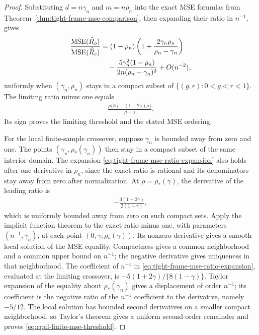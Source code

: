 \documentclass{article}
\theoremstyle{plain} %
\theoremstyle{definition} %
\theoremstyle{definition} %
\newcommand{\hR}{\hat{R}}
\begin{document}
\begin{proof}

Substituting $d=n\gamma_n$ and $m=n\rho_n$ into the exact MSE formulas
from Theorem~\ref{thm:tight-frame-mse-comparison}, then expanding their
ratio in $n^{-1}$, gives
\begin{align}
    \frac{\operatorname{MSE}(\hR_o)}
         {\operatorname{MSE}(\widehat R_c)}
    &=(1-\rho_n)\left(1+
       \frac{2\gamma_n\rho_n}{\rho_n-\gamma_n}\right) \notag\\
    &\quad-\frac{5\gamma_n^2(1-\rho_n)}
       {2n(\rho_n-\gamma_n)^2}+O(n^{-2}),
    \label{eq:tight-frame-mse-ratio-expansion}
\end{align}
uniformly when $(\gamma_n,\rho_n)$ stays in a compact subset of
$\{(g,r):0<g<r<1\}$. The limiting ratio minus one equals
\begin{align*}
    \frac{\rho\{3\gamma-(1+2\gamma)\rho\}}{\rho-\gamma}.
\end{align*}
     Its sign proves the limiting threshold and the stated MSE ordering. 

For the local finite-sample crossover, suppose $\gamma_n$ is bounded away
from zero and one. The points
$(\gamma_n,\rho_*(\gamma_n))$ then stay in a compact subset of the same
interior domain. The expansion
\eqref{eq:tight-frame-mse-ratio-expansion} also holds after one derivative
in $\rho_n$, since the exact ratio is rational and its denominators stay
away from zero after normalization. At $\rho=\rho_*(\gamma)$, the
derivative of the leading ratio is
\begin{align*}
    -\frac{3(1+2\gamma)}{2(1-\gamma)},
\end{align*}
which is uniformly bounded away from zero on such compact sets.
Apply the implicit function theorem to the exact ratio minus one, with
parameters $(n^{-1},\gamma_n)$, at each point
$(0,\gamma,\rho_*(\gamma))$. Its nonzero derivative gives a smooth local
solution of the MSE equality. Compactness gives a common neighborhood
and a common upper bound on $n^{-1}$; the negative derivative gives
uniqueness in that neighborhood.
The coefficient of $n^{-1}$ in
\eqref{eq:tight-frame-mse-ratio-expansion}, evaluated at the limiting
crossover, is $-5(1+2\gamma)/\{8(1-\gamma)\}$. Taylor expansion of the
equality about $\rho_*(\gamma_n)$ gives a displacement of order $n^{-1}$;
its coefficient is the negative ratio of the $n^{-1}$ coefficient to the
derivative, namely $-5/12$. The local solution has bounded second
derivatives on a smaller compact neighborhood, so Taylor's theorem gives
a uniform second-order remainder and proves
\eqref{eq:cpal-finite-mse-threshold}.
\end{proof}
\end{document}

